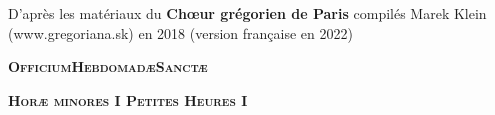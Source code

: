 
\def \feria {A}
\def \feriashort {b}
\def \ohschaptername {c}
\let\feriashort\relax
\let\feria\relax
\clearpage
{}
\begin{center}
D'après les matériaux du \textbf{Chœur grégorien de Paris} 
\linebreak compilés Marek Klein (www.gregoriana.sk) en 2018
\linebreak (version française en 2022)
\end{center}
\thispagestyle{empty}
\clearpage
\begin{center}\huge{\textbf{\textsc{Officium\linebreak Hebdomadæ\linebreak Sanctæ}}}\end{center}

\begin{center}\large{\textbf{\textsc{
Horæ minores I\linebreak
Petites Heures I
}}}\end{center}
\thispagestyle{empty}
\newpage{}



